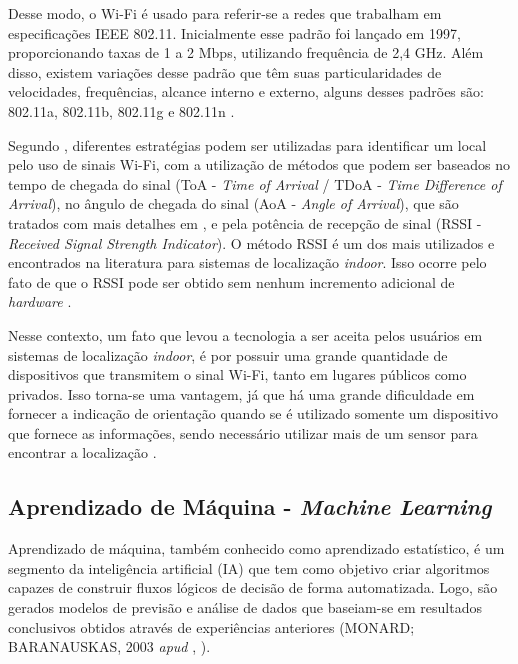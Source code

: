 \documentclass[12pt]{artigoifce}
\begin{document}
Desse modo, o Wi-Fi é usado para referir-se a redes que trabalham em especificações IEEE 802.11. Inicialmente esse padrão foi lançado em 1997, proporcionando taxas de 1 a 2 Mbps, utilizando frequência de 2,4 GHz. Além disso, existem variações desse padrão que têm suas particularidades de velocidades, frequências, alcance interno e externo, alguns desses padrões são: 802.11a, 802.11b, 802.11g e 802.11n \cite{mittelstadt2018}. 

Segundo , diferentes estratégias podem ser utilizadas para identificar um local pelo uso de sinais Wi-Fi, com a utilização de métodos que podem ser baseados no tempo de chegada do sinal (ToA - \textit{Time of Arrival} / TDoA - \textit{Time Difference of Arrival}), no ângulo de chegada do sinal (AoA - \textit{Angle of Arrival}), que são tratados com mais detalhes em , e pela potência de recepção de sinal (RSSI - \textit{Received Signal Strength Indicator}). O método RSSI é um dos mais utilizados e encontrados na literatura para sistemas de localização \textit{indoor}. Isso ocorre pelo fato de que o RSSI pode ser obtido sem nenhum incremento adicional de \textit{hardware} \cite{tatsch2019}.

Nesse contexto, um fato que levou a tecnologia a ser aceita pelos usuários em sistemas de localização \textit{indoor}, é por possuir uma grande quantidade de dispositivos que transmitem o sinal Wi-Fi, tanto em lugares públicos como privados. Isso torna-se uma vantagem, já que há uma grande dificuldade em fornecer a indicação de orientação quando se é utilizado somente um dispositivo que fornece as informações, sendo necessário utilizar mais de um sensor para encontrar a localização \cite{simoes2020, mittelstadt2018}.

\subsection{Aprendizado de Máquina - \textit{Machine Learning}}
\label{sec-fundamentacao-aprendizado-maquina}

Aprendizado de máquina, também conhecido como aprendizado estatístico, é um segmento da inteligência artificial (IA) que tem como objetivo criar algoritmos capazes de construir fluxos lógicos de decisão de forma automatizada. Logo, são gerados modelos de previsão e análise de dados que baseiam-se em resultados conclusivos obtidos através de experiências anteriores (MONARD; BARANAUSKAS, 2003 \textit{apud} \citeauthor{tatsch2019}, \citeyear{tatsch2019}).
\end{document}
